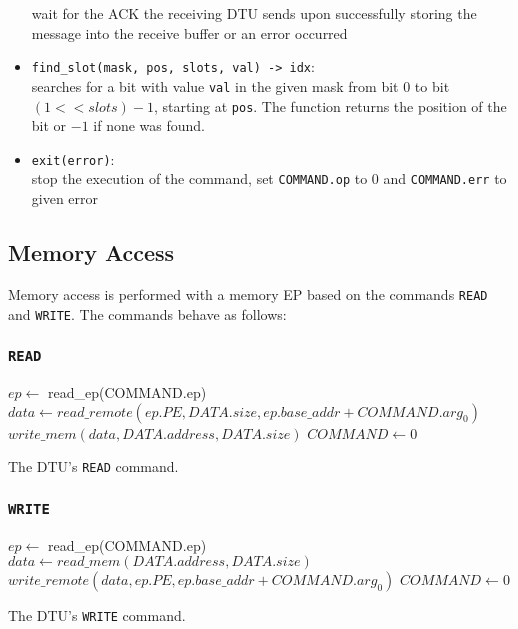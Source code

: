 \documentclass[a4paper,11pt,draft]{article}
\begin{document}
\begin{itemize}
  wait for the ACK the receiving DTU sends upon successfully storing the message into the receive
  buffer or an error occurred
  \item \texttt{find\_slot(mask, pos, slots, val) -> idx}:\\
  searches for a bit with value \texttt{val} in the given mask from bit 0 to bit $(1 << slots) - 1$,
  starting at \texttt{pos}. The function returns the position of the bit or $-1$ if none was found.
  \item \texttt{exit(error)}:\\
  stop the execution of the command, set \texttt{COMMAND.op} to 0 and \texttt{COMMAND.err} to given error
\end{itemize}

\subsection{Memory Access}

Memory access is performed with a memory EP based on the commands \texttt{READ} and \texttt{WRITE}. The commands behave as follows:

\subsubsection{\texttt{READ}}

\begin{algorithm}[H]
    $ep \gets$ read\_ep(COMMAND.ep)\;
    \BlankLine
    $data \gets read\_remote(ep.PE, DATA.size, ep.base\_addr + COMMAND.arg_0)$\;
    $write\_mem(data, DATA.address, DATA.size)$\;
    \BlankLine
    $COMMAND \gets 0$\;
    \caption{The DTU's \texttt{READ} command.}
\end{algorithm}

\subsubsection{\texttt{WRITE}}

\begin{algorithm}[H]
    $ep \gets$ read\_ep(COMMAND.ep)\;
    \BlankLine
    $data \gets read\_mem(DATA.address, DATA.size)$\;
    $write\_remote(data, ep.PE, ep.base\_addr + COMMAND.arg_0)$\;
    \BlankLine
    $COMMAND \gets 0$\;
    \caption{The DTU's \texttt{WRITE} command.}
\end{algorithm}
\end{document}

